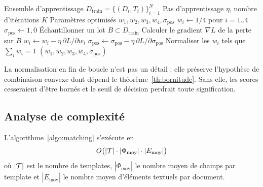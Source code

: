 \begin{algorithm}[H]
\caption{Apprentissage des paramètres du modèle}
\label{algo:apprentissage}
\begin{opalgbox}
\opalgfont
\begin{algorithmic}[1]
\Require Ensemble d'apprentissage $D_{\text{train}} = \{(D_i, T_i)\}_{i=1}^{N}$
\Require Pas d'apprentissage $\eta$, nombre d'itérations $K$
\Ensure Paramètres optimisés $w_1, w_2, w_3, w_4, \sigma_{\text{pos}}$
  \State $w_i \gets 1/4$ pour $i = 1..4$ 
  \State $\sigma_{\text{pos}} \gets 1{,}0$
    \State Échantillonner un lot $B \subset D_{\text{train}}$ 
    \State Calculer le gradient $\nabla L$ de la perte sur $B$
    \State $w_i \gets w_i - \eta\,\partial L / \partial w_i$ 
    \State $\sigma_{\text{pos}} \gets \sigma_{\text{pos}} - \eta\,\partial L / \partial \sigma_{\text{pos}}$ 
    \State Normaliser les $w_i$ tels que $\sum_i w_i = 1$ 
  \EndFor
  \State \Return $(w_1, w_2, w_3, w_4, \sigma_{\text{pos}})$
\EndProcedure
\end{algorithmic}
\end{opalgbox}
\end{algorithm}

La normalisation en fin de boucle n'est pas un détail : elle préserve l'hypothèse de
combinaison convexe dont dépend le théorème~\ref{th:bornitude}. Sans elle, les scores
cesseraient d'être bornés et le seuil de décision perdrait toute signification.

\subsection{Analyse de complexité}
\label{subsec:complexite}

\begin{theoreme}
\label{th:complexite-matching}
L'algorithme~\ref{algo:matching} s'exécute en
\begin{equation}
O\big(|\mathcal{T}| \cdot |\Phi_{\text{moy}}| \cdot |E_{\text{moy}}|\big)
\end{equation}
où $|\mathcal{T}|$ est le nombre de templates, $|\Phi_{\text{moy}}|$ le nombre moyen de champs par
template et $|E_{\text{moy}}|$ le nombre moyen d'éléments textuels par document.
\end{theoreme}

